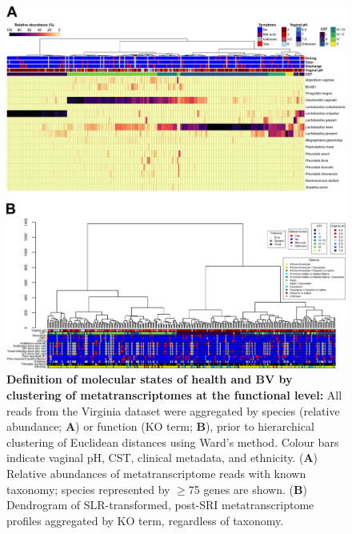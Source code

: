 \documentclass[sn-mathphys,Numbered]{sn-jnl}%
\begin{document}
\begin{figure}[H]
    \centering
    \includegraphics[scale = 0.795]{0_supplFig3.png}
    \caption{\textbf{Definition of molecular states of health and BV by clustering of metatranscriptomes at the functional level:} All reads from the Virginia dataset were aggregated by species (relative abundance; \textbf{A}) or function (KO term; \textbf{B}), prior to hierarchical clustering of Euclidean distances using Ward's method. Colour bars indicate vaginal pH, CST, clinical metadata, and ethnicity. (\textbf{A}) Relative abundances of metatranscriptome reads with known taxonomy; species represented by $\geq$75 genes are shown. (\textbf{B}) Dendrogram of SLR-transformed, post-SRI metatranscriptome profiles aggregated by KO term, regardless of taxonomy.} \label{sig:sfigVirgDendro}
\end{figure}
\newpage
\end{document}
